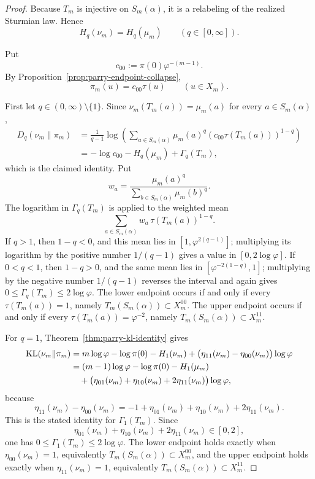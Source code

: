 \begin{proof}
Because \(T_m\) is injective on \(S_m(\alpha)\), it is a relabeling of the
realized Sturmian law. Hence
\[
H_q(\nu_m)=H_q(\mu_m)
\qquad (q\in[0,\infty]).
\]

Put
\[
c_{00}:=\pi(0)\varphi^{-(m-1)}.
\]
By Proposition~\ref{prop:parry-endpoint-collapse},
\[
\pi_m(u)=c_{00}\tau(u)
\qquad (u\in X_m).
\]

First let \(q\in(0,\infty)\setminus\{1\}\). Since
\(\nu_m(T_m(a))=\mu_m(a)\) for every \(a\in S_m(\alpha)\),
\[
\begin{aligned}
D_q(\nu_m\|\pi_m)
&=
\frac{1}{q-1}
\log\!\left(
\sum_{a\in S_m(\alpha)}\mu_m(a)^q(c_{00}\tau(T_m(a)))^{1-q}
\right)\\
&=
-\log c_{00}-H_q(\mu_m)+\Gamma_q(T_m),
\end{aligned}
\]
which is the claimed identity.  Put
\[
w_a=\frac{\mu_m(a)^q}{\sum_{b\in S_m(\alpha)}\mu_m(b)^q}.
\]
The logarithm in \(\Gamma_q(T_m)\) is applied to the weighted mean
\[
\sum_{a\in S_m(\alpha)}w_a\,\tau(T_m(a))^{1-q}.
\]
If \(q>1\), then \(1-q<0\), and this mean lies in
\([1,\varphi^{2(q-1)}]\); multiplying its logarithm by the positive number
\(1/(q-1)\) gives a value in \([0,2\log\varphi]\).  If \(0<q<1\), then
\(1-q>0\), and the same mean lies in \([\varphi^{-2(1-q)},1]\);
multiplying by the negative number \(1/(q-1)\) reverses the interval and
again gives \(0\le \Gamma_q(T_m)\le2\log\varphi\).
The lower endpoint occurs if and only if every \(\tau(T_m(a))=1\), namely
\(T_m(S_m(\alpha))\subset X_m^{00}\). The upper endpoint occurs if and only if
every \(\tau(T_m(a))=\varphi^{-2}\), namely
\(T_m(S_m(\alpha))\subset X_m^{11}\).

For \(q=1\), Theorem~\ref{thm:parry-kl-identity} gives
\[
\begin{aligned}
\operatorname{KL}(\nu_m\|\pi_m)
&=
m\log\varphi-\log\pi(0)-H_1(\nu_m)
+
\bigl(\eta_{11}(\nu_m)-\eta_{00}(\nu_m)\bigr)\log\varphi\\
&=
(m-1)\log\varphi-\log\pi(0)-H_1(\mu_m)\\
&\quad
+
\bigl(\eta_{01}(\nu_m)+\eta_{10}(\nu_m)+2\eta_{11}(\nu_m)\bigr)\log\varphi,
\end{aligned}
\]
because
\[
\eta_{11}(\nu_m)-\eta_{00}(\nu_m)
=
-1+\eta_{01}(\nu_m)+\eta_{10}(\nu_m)+2\eta_{11}(\nu_m).
\]
This is the stated identity for \(\Gamma_1(T_m)\). Since
\[
\eta_{01}(\nu_m)+\eta_{10}(\nu_m)+2\eta_{11}(\nu_m)\in[0,2],
\]
one has \(0\le \Gamma_1(T_m)\le2\log\varphi\). The lower endpoint holds
exactly when \(\eta_{00}(\nu_m)=1\), equivalently
\(T_m(S_m(\alpha))\subset X_m^{00}\), and the upper endpoint holds exactly
when \(\eta_{11}(\nu_m)=1\), equivalently
\(T_m(S_m(\alpha))\subset X_m^{11}\).


\end{proof}
